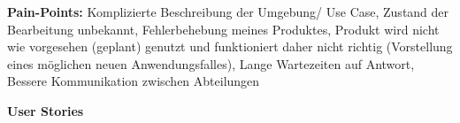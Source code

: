 \vspace{5mm}
\textbf{Pain-Points: } 
Komplizierte Beschreibung der Umgebung/ Use Case, Zustand der Bearbeitung unbekannt, Fehlerbehebung meines Produktes, Produkt wird nicht wie vorgesehen (geplant) genutzt und funktioniert daher nicht richtig (Vorstellung eines möglichen neuen Anwendungsfalles), Lange Wartezeiten auf Antwort, Bessere Kommunikation zwischen Abteilungen






\textbf{User Stories}


